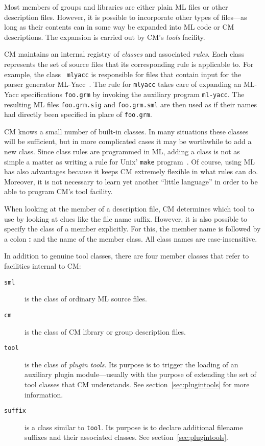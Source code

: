 \documentclass[titlepage,letterpaper]{article}
\begin{document}
Most members of groups and libraries are either plain ML files or
other description files.  However, it is possible to incorporate other
types of files---as long as their contents can in some way be expanded
into ML code or CM descriptions.  The expansion is carried out by CM's
{\it tools} facility.

CM maintains an internal registry of {\em classes} and associated {\em
rules}.  Each class represents the set of source files that its
corresponding rule is applicable to.  For example, the class {\tt
mlyacc} is responsible for files that contain input for the parser
generator ML-Yacc~\cite{tarditi90:yacc}.  The rule for {\tt mlyacc}
takes care of expanding an ML-Yacc specifications {\tt foo.grm} by
invoking the auxiliary program {\tt ml-yacc}.  The resulting ML files
{\tt foo.grm.sig} and {\tt foo.grm.sml} are then used as if their
names had directly been specified in place of {\tt foo.grm}.

CM knows a small number of built-in classes.  In many situations these
classes will be sufficient, but in more complicated cases it may be
worthwhile to add a new class.  Since class rules are programmed in
ML, adding a class is not as simple a matter as writing a rule for
{\sc Unix}' {\tt make} program~\cite{feldman79}.  Of course,
using ML has also advantages because it keeps CM extremely flexible in
what rules can do.  Moreover, it is not necessary to learn yet another
``little language'' in order to be able to program CM's tool facility.

When looking at the member of a description file, CM determines which
tool to use by looking at clues like the file name suffix.  However,
it is also possible to specify the class of a member explicitly.  For
this, the member name is followed by a colon {\bf :} and the name of
the member class.  All class names are case-insensitive.

In addition to genuine tool classes, there are four member classes
that refer to facilities internal to CM:
\begin{description}
\item[{\tt sml}] is the class of ordinary ML source files.
\item[{\tt cm}] is the class of CM library or group description files.
\item[{\tt tool}] is the class of {\em plugin tools}.  Its purpose is
to trigger the loading of an auxiliary plugin module---usually with the
purpose of extending the set of tool classes that CM understands.
See section~\ref{sec:plugintools} for more information.
\item[{\tt suffix}] is a class similar to {\tt tool}.  Its purpose is
to declare additional filename suffixes and their associated classes.
See section~\ref{sec:plugintools}.
\end{description}
\end{document}
